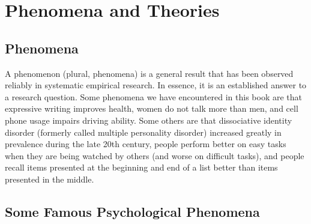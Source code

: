 \section{Phenomena and Theories}


 \subsection{Phenomena}
 
 A phenomenon (plural, phenomena) is a general result that has been observed reliably in systematic empirical
research. In essence, it is an established answer to a research question. Some phenomena we have encountered in this book are that expressive writing improves health, women do not talk more than men, and cell phone usage impairs driving ability. Some others are that dissociative identity disorder (formerly called multiple personality disorder) increased greatly in prevalence during the late 20th century, people perform better on easy tasks when they are being watched by others (and worse on difficult tasks), and people recall items presented at the beginning and end of a list better than items presented in the middle.
 
 \subsection{Some Famous Psychological Phenomena}
 
